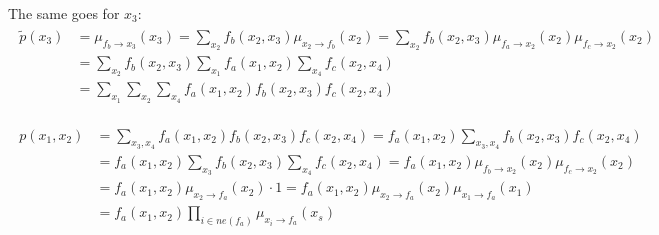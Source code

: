 \documentclass[fleqn]{article}
\begin{document}
The same goes for $x_3$:
\begin{align}
	\begin{split}
		\tilde p(x_3) &= \mu_{f_b\to x_3}(x_3) = \sum\limits_{x_2}f_b(x_2, x_3)\mu_{x_2\to f_b}(x_2) =  \sum\limits_{x_2}f_b(x_2, x_3)\mu_{f_a\to x_2}(x_2) \mu_{f_c\to x_2}(x_2) \\
		&= \sum\limits_{x_2}f_b(x_2, x_3)\sum\limits_{x_1}f_a(x_1, x_2)\sum\limits_{x_4}f_c(x_2, x_4) \\
		&= \sum\limits_{x_1}\sum\limits_{x_2}\sum\limits_{x_4}f_a(x_1, x_2)f_b(x_2, x_3)f_c(x_2, x_4)
	\end{split}
\end{align}


\begin{align}
\begin{split}
	p(x_1, x_2) &= \sum\limits_{x_3,x_4}f_a(x_1,x_2)f_b(x_2,x_3)f_c(x_2, x_4) = f_a(x_1,x_2)\sum\limits_{x_3,x_4}f_b(x_2,x_3)f_c(x_2, x_4) \\
	&= f_a(x_1,x_2)\sum\limits_{x_3}f_b(x_2,x_3)\sum\limits_{x_4}f_c(x_2, x_4) = f_a(x_1,x_2)\mu_{f_b\to x_2}(x_2)\mu_{f_c\to x_2}(x_2) \\
	&= f_a(x_1,x_2)\mu_{x_2 \to f_a}(x_2) \cdot 1 = f_a(x_1,x_2)\mu_{x_2 \to f_a}(x_2) \mu_{x_1 \to f_a}(x_1) \\
	&= f_a(x_1, x_2) \prod\limits_{i \in ne(f_a)} \mu_{x_i \to f_a}(x_s)
\end{split}
\end{align}
\end{document}
